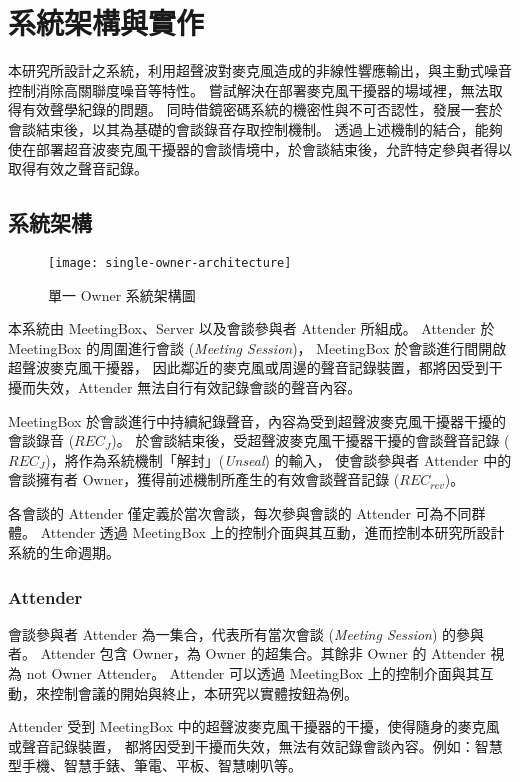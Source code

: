 \chapter{系統架構與實作}

    本研究所設計之系統，利用超聲波對麥克風造成的非線性響應輸出，與主動式噪音控制消除高關聯度噪音等特性。
嘗試解決在部署麥克風干擾器的場域裡，無法取得有效聲學紀錄的問題。
同時借鏡密碼系統的機密性與不可否認性，發展一套於會談結束後，以其為基礎的會談錄音存取控制機制。
透過上述機制的結合，能夠使在部署超音波麥克風干擾器的會談情境中，於會談結束後，允許特定參與者得以取得有效之聲音記錄。


\section{系統架構}

\begin{figure}[H]
    \centering
    \texttt{[image: single-owner-architecture]}
    \caption{單一 Owner 系統架構圖}
    \label{fig.s-o-arch}
\end{figure}

    本系統由 MeetingBox、Server 以及會談參與者 Attender 所組成。
Attender 於 MeetingBox 的周圍進行會談 ({\it Meeting Session})，
MeetingBox 於會談進行間開啟超聲波麥克風干擾器，
因此鄰近的麥克風或周邊的聲音記錄裝置，都將因受到干擾而失效，Attender 無法自行有效記錄會談的聲音內容。

    MeetingBox 於會談進行中持續紀錄聲音，內容為受到超聲波麥克風干擾器干擾的會談錄音 ($REC_{J}$)。
於會談結束後，受超聲波麥克風干擾器干擾的會談聲音記錄 ($REC_{J}$)，將作為系統機制「解封」({\it Unseal}) 的輸入，
使會談參與者 Attender 中的會談擁有者 Owner，獲得前述機制所產生的有效會談聲音記錄 ($REC_{rev}$)。

    各會談的 Attender 僅定義於當次會談，每次參與會談的 Attender 可為不同群體。
Attender 透過 MeetingBox 上的控制介面與其互動，進而控制本研究所設計系統的生命週期。


\subsection{Attender}

    會談參與者 Attender 為一集合，代表所有當次會談 ({\it Meeting Session}) 的參與者。
Attender 包含 Owner，為 Owner 的超集合。其餘非 Owner 的 Attender 視為 not Owner Attender。
Attender 可以透過 MeetingBox 上的控制介面與其互動，來控制會議的開始與終止，本研究以實體按鈕為例。

    Attender 受到 MeetingBox 中的超聲波麥克風干擾器的干擾，使得隨身的麥克風或聲音記錄裝置，
都將因受到干擾而失效，無法有效記錄會談內容。例如：智慧型手機、智慧手錶、筆電、平板、智慧喇叭等。


